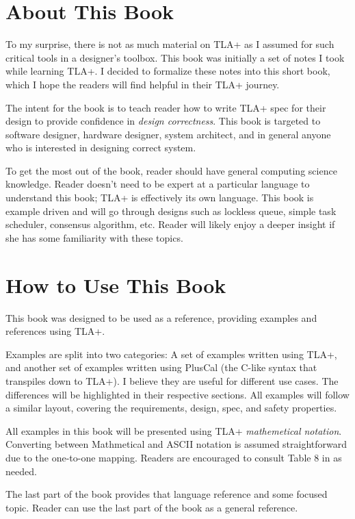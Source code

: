 \section{About This Book}

To my surprise, there is not as much material on TLA+ as I assumed for such
critical tools in a designer's toolbox. This book was initially a set of notes I
took while learning TLA+. I decided to formalize these notes into this short
book, which I hope the readers will find helpful in their TLA+ journey.\newline

The intent for the book is to teach reader how to write TLA+ spec for their
design to provide confidence in \textit{design correctness}. This book is
targeted to software designer, hardware designer, system architect, and in
general anyone who is interested in designing correct system.\newline 

To get the most out of the book, reader should have general computing science
knowledge. Reader doesn't need to be expert at a particular language to
understand this book; TLA+ is effectively its own language. This book is example
driven and will go through designs such as lockless queue, simple task
scheduler, consensus algorithm, etc. Reader will likely enjoy a deeper insight
if she has some familiarity with these topics.

\section{How to Use This Book}

This book was designed to be used as a reference, providing examples and
references using TLA+.\newline

Examples are split into two categories: A set of examples written using TLA+,
and another set of examples written using PlusCal (the C-like syntax that
transpiles down to TLA+). I believe they are useful for different use cases.
The differences will be highlighted in their respective sections. All examples
will follow a similar layout, covering the requirements, design, spec, and 
safety properties.\newline

All examples in this book will be presented using TLA+ \textit{mathemetical
notation}. Converting between Mathmetical and ASCII notation is assumed
straightforward due to the one-to-one mapping. Readers are encouraged to consult
Table 8 in \cite{ss} as needed.\newline

The last part of the book provides that language reference and some focused
topic. Reader can use the last part of the book as a general reference. 

